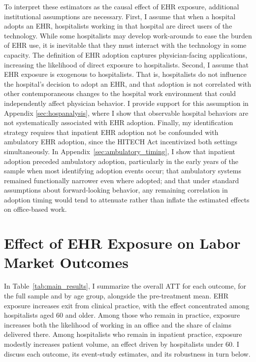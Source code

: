 \documentclass[12pt]{article}
\begin{document}
To interpret these estimators as the causal effect of EHR exposure, additional institutional assumptions are necessary. First, I assume that when a hospital adopts an EHR, hospitalists working in that hospital are direct users of the technology. While some hospitalists may develop work-arounds to ease the burden of EHR use, it is inevitable that they must interact with the technology in some capacity. The definition of EHR adoption captures physician-facing applications, increasing the likelihood of direct exposure to hospitalists. Second, I assume that EHR exposure is exogenous to hospitalists. That is, hospitalists do not influence the hospital's decision to adopt an EHR, and that adoption is not correlated with other contemporaneous changes to the hospital work environment that could independently affect physician behavior. I provide support for this assumption in Appendix \ref{sec:hospanalysis}, where I show that observable hospital behaviors are not systematically associated with EHR adoption. Finally, my identification strategy requires that inpatient EHR adoption not be confounded with ambulatory EHR adoption, since the HITECH Act incentivized both settings simultaneously. In Appendix~\ref{sec:ambulatory_timing}, I show that inpatient adoption preceded ambulatory adoption, particularly in the early years of the sample when most identifying adoption events occur; that ambulatory systems remained functionally narrower even where adopted; and that under standard assumptions about forward-looking behavior, any remaining correlation in adoption timing would tend to attenuate rather than inflate the estimated effects on office-based work.

\section{Effect of EHR Exposure on Labor Market Outcomes}\label{sec:results}

In Table~\ref{tab:main_results}, I summarize the overall ATT for each outcome, for the full sample and by age group, alongside the pre-treatment mean. EHR exposure increases exit from clinical practice, with the effect concentrated among hospitalists aged 60 and older. Among those who remain in practice, exposure increases both the likelihood of working in an office and the share of claims delivered there. Among hospitalists who remain in inpatient practice, exposure modestly increases patient volume, an effect driven by hospitalists under 60. I discuss each outcome, its event-study estimates, and its robustness in turn below.
\end{document}
